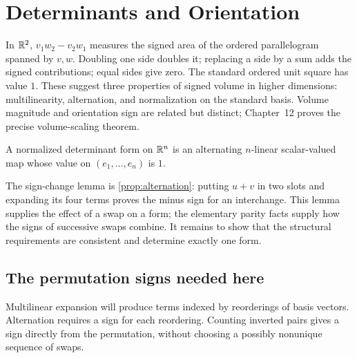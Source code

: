 \section{Determinants and Orientation}
\label{sec:determinants}
In $\mathbb{R}^2$, $v_1w_2-v_2w_1$ measures the signed area of the ordered
parallelogram spanned by $v,w$. Doubling one side doubles it; replacing
a side by a sum adds the signed contributions; equal sides give zero.
The standard ordered unit square has value $1$. These suggest three
properties of signed volume in higher dimensions: multilinearity,
alternation, and normalization on the standard basis. Volume magnitude
and orientation sign are related but distinct; Chapter~12 proves the
precise volume-scaling theorem.

\begin{definition}
A normalized determinant form on $\mathbb{R}^n$ is an alternating $n$-linear
scalar-valued map whose value on $(e_1,\ldots,e_n)$ is $1$.
\end{definition}
The sign-change lemma is \cref{prop:alternation}: putting $u+v$ in
two slots and expanding its four terms proves the minus sign for an
interchange. This lemma supplies the effect of a swap on a form; the
elementary parity facts supply how the signs of successive swaps combine.
It remains to show that the structural requirements are consistent and
determine exactly one form.

\subsection*{The permutation signs needed here}

Multilinear expansion will produce terms indexed by reorderings of basis
vectors. Alternation requires a sign for each reordering. Counting inverted
pairs gives a sign directly from the permutation, without choosing a
possibly nonunique sequence of swaps.

